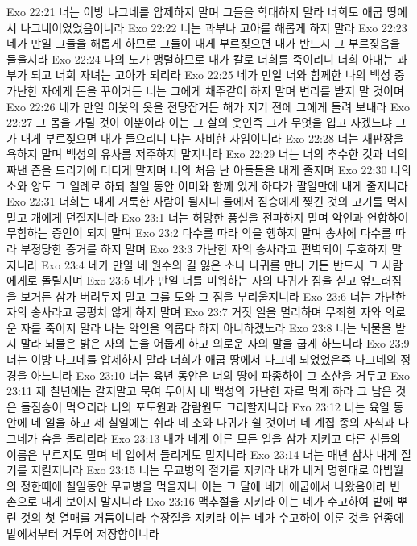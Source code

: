 Exo 22:21  너는 이방 나그네를 압제하지 말며 그들을 학대하지 말라 너희도 애굽 땅에서 나그네이었었음이니라
Exo 22:22  너는 과부나 고아를 해롭게 하지 말라
Exo 22:23  네가 만일 그들을 해롭게 하므로 그들이 내게 부르짖으면 내가 반드시 그 부르짖음을 들을지라
Exo 22:24  나의 노가 맹렬하므로 내가 칼로 너희를 죽이리니 너희 아내는 과부가 되고 너희 자녀는 고아가 되리라
Exo 22:25  네가 만일 너와 함께한 나의 백성 중 가난한 자에게 돈을 꾸이거든 너는 그에게 채주같이 하지 말며 변리를 받지 말 것이며
Exo 22:26  네가 만일 이웃의 옷을 전당잡거든 해가 지기 전에 그에게 돌려 보내라
Exo 22:27  그 몸을 가릴 것이 이뿐이라 이는 그 살의 옷인즉 그가 무엇을 입고 자겠느냐 그가 내게 부르짖으면 내가 들으리니 나는 자비한 자임이니라
Exo 22:28  너는 재판장을 욕하지 말며 백성의 유사를 저주하지 말지니라
Exo 22:29  너는 너의 추수한 것과 너의 짜낸 즙을 드리기에 더디게 말지며 너의 처음 난 아들들을 내게 줄지며
Exo 22:30  너의 소와 양도 그 일례로 하되 칠일 동안 어미와 함께 있게 하다가 팔일만에 내게 줄지니라
Exo 22:31  너희는 내게 거룩한 사람이 될지니 들에서 짐승에게 찢긴 것의 고기를 먹지 말고 개에게 던질지니라
Exo 23:1  너는 허망한 풍설을 전파하지 말며 악인과 연합하여 무함하는 증인이 되지 말며
Exo 23:2  다수를 따라 악을 행하지 말며 송사에 다수를 따라 부정당한 증거를 하지 말며
Exo 23:3  가난한 자의 송사라고 편벽되이 두호하지 말지니라
Exo 23:4  네가 만일 네 원수의 길 잃은 소나 나귀를 만나 거든 반드시 그 사람에게로 돌릴지며
Exo 23:5  네가 만일 너를 미워하는 자의 나귀가 짐을 싣고 엎드러짐을 보거든 삼가 버려두지 말고 그를 도와 그 짐을 부리울지니라
Exo 23:6  너는 가난한 자의 송사라고 공평치 않게 하지 말며
Exo 23:7  거짓 일을 멀리하며 무죄한 자와 의로운 자를 죽이지 말라 나는 악인을 의롭다 하지 아니하겠노라
Exo 23:8  너는 뇌물을 받지 말라 뇌물은 밝은 자의 눈을 어둡게 하고 의로운 자의 말을 굽게 하느니라
Exo 23:9  너는 이방 나그네를 압제하지 말라 너희가 애굽 땅에서 나그네 되었었은즉 나그네의 정경을 아느니라
Exo 23:10  너는 육년 동안은 너의 땅에 파종하여 그 소산을 거두고
Exo 23:11  제 칠년에는 갈지말고 묵여 두어서 네 백성의 가난한 자로 먹게 하라 그 남은 것은 들짐승이 먹으리라 너의 포도원과 감람원도 그리할지니라
Exo 23:12  너는 육일 동안에 네 일을 하고 제 칠일에는 쉬라 네 소와 나귀가 쉴 것이며 네 계집 종의 자식과 나그네가 숨을 돌리리라
Exo 23:13  내가 네게 이른 모든 일을 삼가 지키고 다른 신들의 이름은 부르지도 말며 네 입에서 들리게도 말지니라
Exo 23:14  너는 매년 삼차 내게 절기를 지킬지니라
Exo 23:15  너는 무교병의 절기를 지키라 내가 네게 명한대로 아빕월의 정한때에 칠일동안 무교병을 먹을지니 이는 그 달에 네가 애굽에서 나왔음이라 빈 손으로 내게 보이지 말지니라
Exo 23:16  맥추절을 지키라 이는 네가 수고하여 밭에 뿌린 것의 첫 열매를 거둠이니라 수장절을 지키라 이는 네가 수고하여 이룬 것을 연종에 밭에서부터 거두어 저장함이니라
